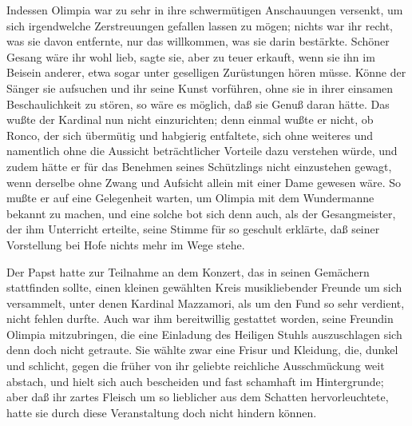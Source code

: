 Indessen Olimpia war zu sehr in ihre schwermütigen Anschauungen
versenkt, um sich irgendwelche Zerstreuungen gefallen lassen zu
mögen; nichts war ihr recht, was sie davon entfernte, nur das
willkommen, was sie darin bestärkte. Schöner Gesang wäre ihr wohl
lieb, sagte sie, aber zu teuer erkauft, wenn sie ihn im Beisein
anderer, etwa sogar unter geselligen Zurüstungen hören müsse. Könne
der Sänger sie aufsuchen und ihr seine Kunst vorführen, ohne sie in
ihrer einsamen Beschaulichkeit zu stören, so wäre es möglich, daß
sie Genuß daran hätte. Das wußte der Kardinal nun nicht
\pagenum{[83]} einzurichten; denn einmal wußte er nicht, ob Ronco,
der sich übermütig und habgierig entfaltete, sich ohne weiteres und
namentlich ohne die Aussicht beträchtlicher Vorteile dazu verstehen
würde, und zudem hätte er für das Benehmen seines Schützlings nicht
einzustehen gewagt, wenn derselbe ohne Zwang und Aufsicht allein
mit einer Dame gewesen wäre. So mußte er auf eine Gelegenheit
warten, um Olimpia mit dem Wundermanne bekannt zu machen, und eine
solche bot sich denn auch, als der Gesangmeister, der ihm
Unterricht erteilte, seine Stimme für so geschult erklärte, daß
seiner Vorstellung bei Hofe nichts mehr im Wege stehe.

Der Papst hatte zur Teilnahme an dem Konzert, das in seinen
Gemächern stattfinden sollte, einen kleinen gewählten Kreis
musikliebender Freunde um sich versammelt, unter denen Kardinal
Mazzamori, als um den Fund so sehr verdient, nicht fehlen durfte.
Auch war ihm bereitwillig gestattet worden, seine Freundin Olimpia
mitzubringen, die eine Einladung des Heiligen Stuhls auszuschlagen
sich denn doch nicht getraute. Sie wählte zwar eine Frisur und
Kleidung, die, dunkel und schlicht, gegen die früher von ihr
geliebte reichliche Ausschmückung weit abstach, und hielt sich auch
bescheiden und fast schamhaft im Hintergrunde; aber daß ihr zartes
Fleisch um so lieblicher aus dem Schatten hervorleuchtete, hatte
sie durch diese Veranstaltung doch nicht hindern können.

